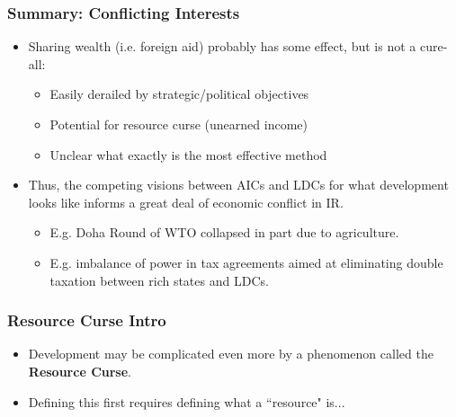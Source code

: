 \documentclass[handout]{beamer}
\begin{document}
\begin{frame} 
	\frametitle{\LARGE{Summary: Conflicting Interests}}
	\begin{itemize}
		\item Sharing wealth (i.e. foreign aid) probably has some effect, but is not a cure-all: \pause 
		\begin{itemize}
			\item Easily derailed by strategic/political objectives \pause 
			\item Potential for resource curse (unearned income)\pause 
			\item Unclear what exactly is the most effective method \pause 
		\end{itemize}
		\item Thus, the competing visions between AICs and LDCs for what development looks like informs a great deal of economic conflict in IR. \pause 
		\begin{itemize}
			\item E.g. Doha Round of WTO collapsed in part due to agriculture. \pause 
			\item E.g. imbalance of power in tax agreements aimed at eliminating double taxation between rich states and LDCs.
		\end{itemize}
	\end{itemize}
\end{frame}

\begin{frame} 
	\frametitle{\LARGE{Resource Curse Intro}}
	\begin{itemize}
		\item Development may be complicated even more by a phenomenon called the \textbf{Resource Curse}.
		\item Defining this first requires defining what a ``resource" is...
		
	\end{itemize}
\end{frame}
\end{document}
